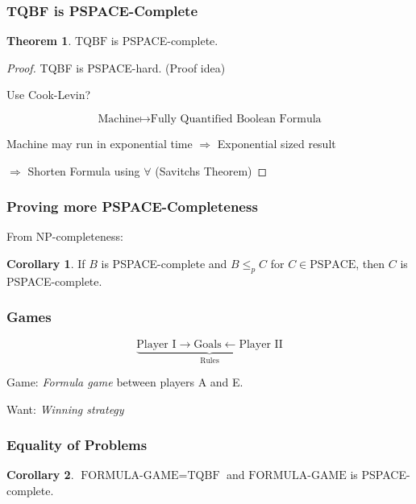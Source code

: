 \documentclass[notheorems]{beamer}
\theoremstyle{definition}
\newtheorem{theorem}{Theorem}
\newtheorem{corollary}{Corollary}
\theoremstyle{remark}
\newcommand{\pspaceclass}{\text{PSPACE}}
\newcommand{\tqbfprob}{\text{TQBF}}
\newcommand{\formulagameprob}{\text{FORMULA-GAME}}
\begin{document}
\begin{frame}
    \frametitle{TQBF is PSPACE-Complete}

    \begin{theorem}
        \(
            \tqbfprob
        \) is PSPACE-complete.
    \end{theorem}
    \begin{proof}
        \pause
        TQBF is PSPACE-hard. (Proof idea)

        Use Cook-Levin?

        \[
            \text{Machine} \longmapsto \text{Fully Quantified Boolean Formula}
        \]

        \pause
            
        Machine may run in exponential time \(\Rightarrow\) Exponential sized result

        \pause

        \(\Rightarrow\) Shorten Formula using \(\forall\) (Savitchs Theorem)
    \end{proof}

\end{frame}

\begin{frame}
    \frametitle{Proving more PSPACE-Completeness}

    From NP-completeness:
    \pause
    \begin{corollary}
        If \(B\) is PSPACE-complete and \(B \leq_p C\) for \(C \in \pspaceclass\), then \(C\) is PSPACE-complete.
    \end{corollary}

\end{frame}

\begin{frame}
    \frametitle{Games}

    \begin{ceqn}
        \[
            \underbrace{\text{Player I} \rightarrow \text{Goals} \leftarrow \text{Player II}}_{\text{Rules}}
        \]
    \end{ceqn}
    \pause
    Game: \emph{Formula game} between players A and E.

    \pause
    Want: \emph{Winning strategy}

\end{frame}

\begin{frame}
    \frametitle{Equality of Problems}

    \pause

    \begin{corollary} \(\formulagameprob = \tqbfprob\) and \(\formulagameprob\) is PSPACE-complete.
    \end{corollary}

\end{frame}
\end{document}

